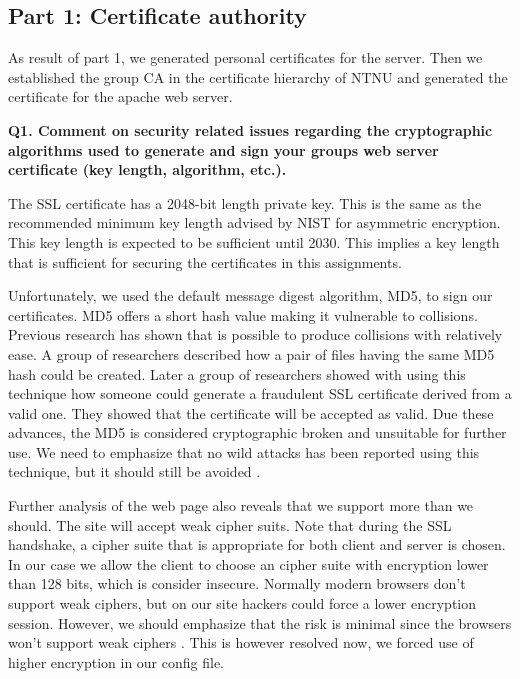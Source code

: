 
\subsection {Part 1: Certificate authority}

As result of part 1, we generated personal certificates for the server. Then we established the group CA in the certificate hierarchy of NTNU and generated the certificate for the apache web server. 
\newline

\noindent
{\bf Q1. Comment on security related issues regarding the cryptographic algorithms used to generate and sign your groups web server certificate (key length, algorithm, etc.).}
\newline

\noindent
The SSL certificate has a 2048-bit length private key. This is the same as the recommended minimum key length advised by NIST for asymmetric encryption. This key length is expected to be sufficient until 2030. \cite{nisc}This implies a key length that is sufficient for securing the certificates in this assignments. 
\newline

\noindent
Unfortunately, we used the default message digest algorithm, MD5, to sign our certificates. MD5 offers a short hash value making it vulnerable to collisions. Previous research has shown that is possible to produce collisions with relatively ease. A group of researchers described how a pair of files having the same MD5 hash could be created. Later a group of researchers showed with using this technique how someone could generate a fraudulent SSL certificate derived from a valid one. They showed that the certificate will be accepted as valid. Due these advances, the MD5 is considered cryptographic broken and unsuitable for further use. We need to emphasize that no wild attacks has been reported using this technique, but it should still be avoided \cite {md5Wiki, md5Networking}.
\newline

\noindent
Further analysis of the web page also reveals that we support more than we should. The site will accept weak cipher suits. Note that during the SSL handshake, a cipher suite that is appropriate for both client and server is chosen. In our case we allow the client to choose an cipher suite with encryption lower than 128 bits, which is consider insecure. Normally modern browsers don't support weak ciphers, but on our site hackers could force a lower encryption session. However, we should emphasize that the risk is minimal since the browsers won't support weak ciphers \cite {cipher}. This is however resolved now, we forced use of higher encryption in our config file. 
\newline

  






